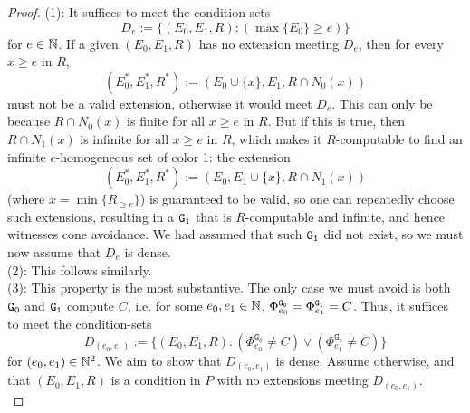 \documentclass{amsart}
\begin{document}
\begin{proof}
		(1): It suffices to meet the condition-sets
		$$
		D_e := \{(E_0,E_1,R) : (\max\{E_0\}\geq e)\}
		$$
		for $e\in \mathbb{N}$. If a given $(E_0,E_1,R)$ has no extension meeting $D_e$, then for every $x\geq e$ in $R$,
		$$
		(E_0^*,E_1^*,R^*) := (E_0 \cup \{x\},E_1,R \cap N_0(x))
		$$
		must not be a valid extension, otherwise it would meet $D_e$. This can only be because $R\cap N_0(x)$ is finite for all $x \geq e$ in $R$. But if this is true, then $R\cap N_1(x)$ is infinite for all $x\geq e$ in $R$, which makes it $R$-computable to find an infinite $c$-homogeneous set of color 1: the extension
		$$
		(E_0^*,E_1^*,R^*) := (E_0,E_1 \cup \{x\},R\cap N_1(x))
		$$
		(where $x = \min \{R_{\geq e}\}$) is guaranteed to be valid, so one can repeatedly choose such extensions, resulting in a $\tt{G_1}$ that is $R$-computable and infinite, and hence witnesses cone avoidance. We had assumed that such $\tt{G_1}$ did not exist, so we must now assume that $D_e$ is dense. \\
		
		(2): This follows similarly.
		\\
		
		(3): This property is the most substantive. The only case we must avoid is both $\tt{G_0}$ and $\tt{G_1}$ compute $C$, i.e. for some $e_0,e_1\in \mathbb{N}$, $\Phi^{\tt{G_0}}_{e_0}=\Phi^{\tt{G_1}}_{e_1}=C$. Thus, it suffices to meet the condition-sets
		$$
		D_{(e_0,e_1)} := \{(E_0,E_1,R): (\Phi_{e_0}^{\mathtt{G_0}}\neq C) \vee (\Phi_{e_1}^{\mathtt{G_1}}\neq C) \}
		$$
		for $(e_0,e_1)\in \mathbb{N}^2$. We aim to show that $D_{(e_0,e_1)}$ is dense. Assume otherwise, and that $(E_0,E_1,R)$ is a condition in $P$ with no extensions meeting $D_{(e_0,e_1)}$.\\
		
		
		

\end{proof}
\end{document}
